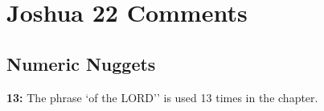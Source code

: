 \section{Joshua 22 Comments}

\subsection{Numeric Nuggets}
\textbf{13: } The phrase `of the LORD'' is used 13 times in the chapter.

